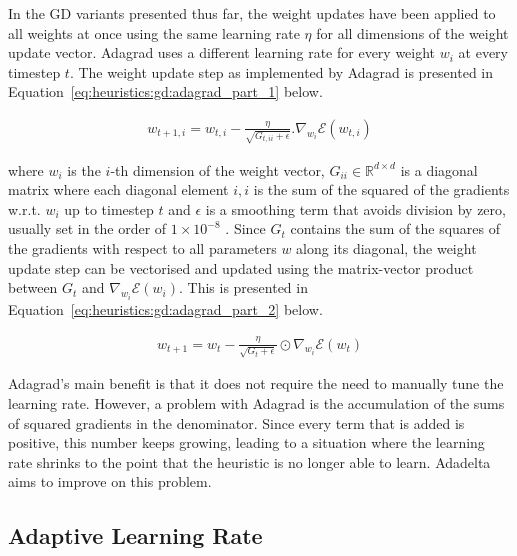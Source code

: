 In the \ac{GD} variants presented thus far, the weight updates have been applied to all weights at once using the same learning rate $\eta$ for all dimensions of the weight update vector. \Ac{Adagrad} uses a different learning rate for every weight $w_{i}$ at every timestep $t$. The weight update step as implemented by \ac{Adagrad} is presented in Equation~\ref{eq:heuristics:gd:adagrad_part_1} below.

\begin{equation}
      \label{eq:heuristics:gd:adagrad_part_1}
      \begin{split}
            w_{t+1,i} = w_{t,i} - \frac{\eta}{\sqrt{G_{t,ii} + \epsilon}}.\nabla_{w_{i}}\mathcal{E}(w_{t,i})
      \end{split}
\end{equation}

where $w_{i}$ is the $i$-th dimension of the weight vector, $G_{ii} \in \mathbb{R}^{d \times d}$ is a diagonal matrix where each diagonal element $i,i$ is the sum of the squared of the gradients w.r.t. $w_{i}$ up to timestep $t$ and $\epsilon$ is a smoothing term that avoids division by zero, usually set in the order of $1 \times 10^{-8}$ \cite{ref:ruder:2016}. Since $G_{t}$ contains the sum of the squares of the gradients with respect to all parameters $w$ along its diagonal, the weight update step can be vectorised and updated using the matrix-vector product between $G_{t}$ and $\nabla_{w_{i}}\mathcal{E}(w_{i})$. This is presented in Equation~\ref{eq:heuristics:gd:adagrad_part_2} below.

\begin{equation}
      \label{eq:heuristics:gd:adagrad_part_2}
      \begin{split}
            w_{t+1} = w_{t} - \frac{\eta}{\sqrt{G_{t} + \epsilon}} \odot \nabla_{w_{i}}\mathcal{E}(w_{t})
      \end{split}
\end{equation}

\Ac{Adagrad}'s main benefit is that it does not require the need to manually tune the learning rate. However, a problem with \ac{Adagrad} is the accumulation of the sums of squared gradients in the denominator. Since every term that is added is positive, this number keeps growing, leading to a situation where the learning rate shrinks to the point that the heuristic is no longer able to learn. \acl{Adadelta} aims to improve on this problem.

\subsection{Adaptive Learning Rate}
\label{sec:heuristics:adadelta}

